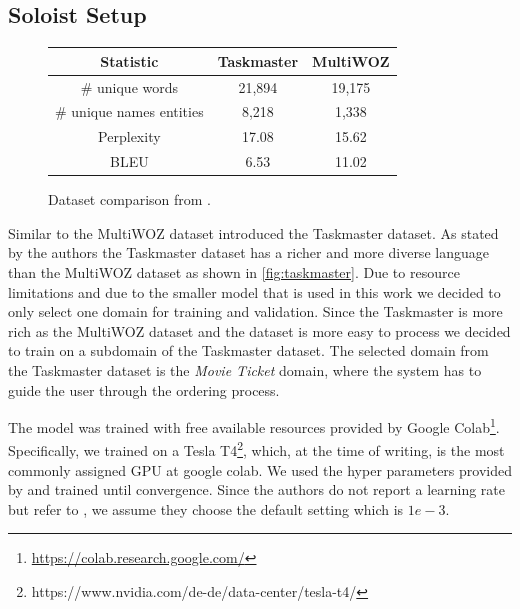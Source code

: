 \documentclass[twocolumn]{tum-article}
\begin{document}
\subsection{Soloist Setup}\label{sec:soloist_setup}
\begin{figure}[!h]
\centering
\begin{tabular}{c|c|c}
\hline
\textbf{Statistic} & \textbf{Taskmaster} & \textbf{MultiWOZ}\\
\hline
\# unique words & 21,894 & 19,175 \\
\hline
\# unique names entities & 8,218 & 1,338 \\
\hline
Perplexity & 17.08 & 15.62 \\
\hline
BLEU & 6.53 & 11.02\\
\hline
\end{tabular}
\caption{Dataset comparison from \cite{byrne2019taskmaster}.}
\label{fig:taskmaster}
\end{figure}
Similar to the MultiWOZ dataset \cite{byrne2019taskmaster} introduced the Taskmaster dataset. As stated by the authors the Taskmaster dataset has a richer and more diverse language than the MultiWOZ dataset as shown in \autoref{fig:taskmaster}. Due to resource limitations and due to the smaller model that is used in this work we decided to only select one domain for training and validation. Since the Taskmaster is more rich as the MultiWOZ dataset and the dataset is more easy to process we decided to train on a subdomain of the Taskmaster dataset. The selected domain from the Taskmaster dataset is the \textit{Movie Ticket} domain, where the system has to guide the user through the ordering process. 

The model was trained with free available resources provided by Google Colab\footnote{\url{https://colab.research.google.com/}}. Specifically, we trained on a Tesla T4\footnote{https://www.nvidia.com/de-de/data-center/tesla-t4/}, which, at the time of writing, is the most commonly assigned GPU at google colab. We used the hyper parameters provided by \cite{peng2020soloist} and trained until convergence. Since the authors do not report a learning rate but refer to \cite{kingma2014adam}, we assume they choose the default setting which is $1e-3$. 
\end{document}
